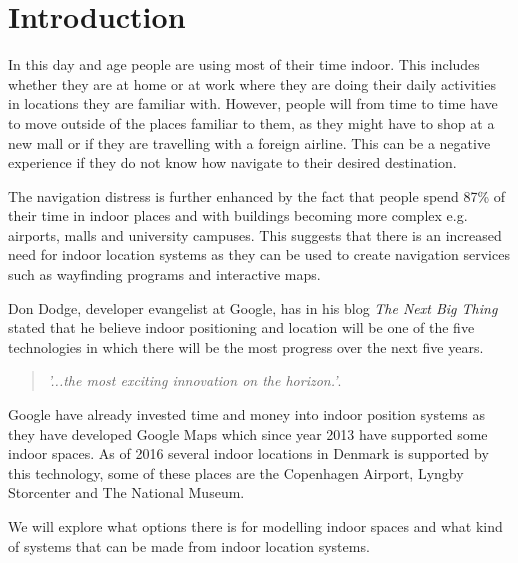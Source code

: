 \chapter{Introduction}
In this day and age people are using most of their time indoor. This includes whether they are at home or at work where they are doing their daily activities in locations they are familiar with. However, people will from time to time have to move outside of the places  familiar to them, as they might have to shop at a new mall or if they are travelling with a foreign airline. This can be a negative experience if they do not know how navigate to their desired destination. 

The navigation distress is further enhanced by the fact that people spend 87\% of their time in indoor places and with buildings becoming more complex e.g. airports, malls and university campuses\cite{klepeis2001national}. This suggests that there is an increased need for indoor location systems as they can be used to create navigation services such as wayfinding programs and interactive maps. %

Don Dodge, developer evangelist at Google, has in his blog \textit{The Next Big Thing} stated that he believe indoor positioning and location will be one of the five technologies in which there will be the most progress over the next five years\cite{DonDIndoorIsNext}.
\begin{quotation}
	\textit{'...the most exciting innovation on the horizon.'}\cite{DonDNextBigThing}.
\end{quotation}
Google have already invested time and money into indoor position systems as they have developed Google Maps which since year 2013 have supported some indoor spaces\cite{google_indoor}. As of 2016 several indoor locations in Denmark is supported by this technology, some of these places are the Copenhagen Airport, Lyngby Storcenter and The National Museum\cite{google_dk}.

We will explore what options there is for modelling indoor spaces and what kind of systems that can be made from indoor location systems.